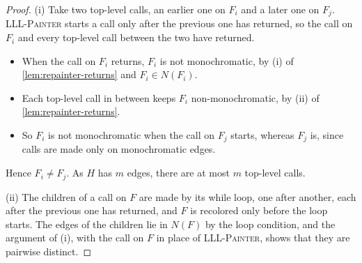 \begin{proof}
    (i) Take two top-level calls, an earlier one on \(F_{i}\) and a later one on \(F_{j}\). \textsc{LLL-Painter} starts a call only after the previous one has returned, so the call on \(F_{i}\) and every top-level call between the two have returned.
    \begin{itemize}
        \item When the call on \(F_{i}\) returns, \(F_{i}\) is not monochromatic, by (i) of \autoref{lem:repainter-returns} and \(F_{i} \in N(F_{i})\).
        \item Each top-level call in between keeps \(F_{i}\) non-monochromatic, by (ii) of \autoref{lem:repainter-returns}.
        \item So \(F_{i}\) is not monochromatic when the call on \(F_{j}\) starts, whereas \(F_{j}\) is, since calls are made only on monochromatic edges.
    \end{itemize}
    Hence \(F_{i} \ne F_{j}\). As \(H\) has \(m\) edges, there are at most \(m\) top-level calls.

    (ii) The children of a call on \(F\) are made by its while loop, one after another, each after the previous one has returned, and \(F\) is recolored only before the loop starts. The edges of the children lie in \(N(F)\) by the loop condition, and the argument of (i), with the call on \(F\) in place of \textsc{LLL-Painter}, shows that they are pairwise distinct.
\end{proof}

